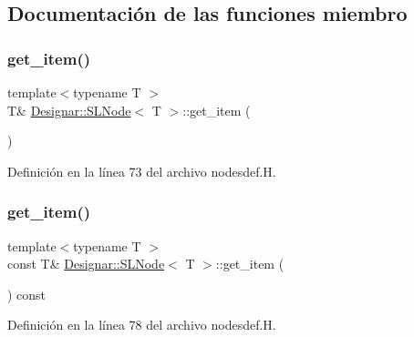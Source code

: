 \subsection{Documentación de las funciones miembro}
\mbox{\label{class_designar_1_1_s_l_node_a8b1b374efe3c861930b24515fb15d243}} 
\subsubsection{\texorpdfstring{get\+\_\+item()}{get\_item()}\hspace{0.1cm}{\footnotesize\ttfamily [1/2]}}
{\footnotesize\ttfamily template$<$typename T $>$ \\
T\& \hyperlink{class_designar_1_1_s_l_node}{Designar\+::\+S\+L\+Node}$<$ T $>$\+::get\+\_\+item (\begin{DoxyParamCaption}{ }\end{DoxyParamCaption})\hspace{0.3cm}{\ttfamily [inline]}}



Definición en la línea 73 del archivo nodesdef.\+H.

\mbox{\label{class_designar_1_1_s_l_node_a3bda4e61a77ff2df2096850759605257}} 
\subsubsection{\texorpdfstring{get\+\_\+item()}{get\_item()}\hspace{0.1cm}{\footnotesize\ttfamily [2/2]}}
{\footnotesize\ttfamily template$<$typename T $>$ \\
const T\& \hyperlink{class_designar_1_1_s_l_node}{Designar\+::\+S\+L\+Node}$<$ T $>$\+::get\+\_\+item (\begin{DoxyParamCaption}{ }\end{DoxyParamCaption}) const\hspace{0.3cm}{\ttfamily [inline]}}



Definición en la línea 78 del archivo nodesdef.\+H.

